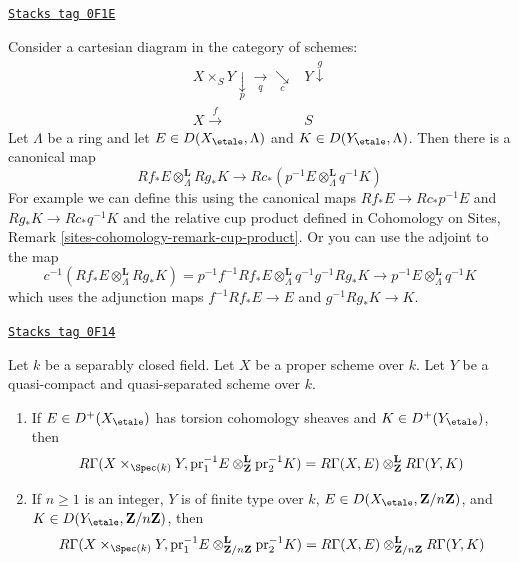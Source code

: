 \begin{remark}
\label{etale-cohomology-remark-define-kunneth-map}
\href{https://stacks.math.columbia.edu/tag/0F1E}{\texttt{Stacks tag 0F1E}}

Consider a cartesian diagram in the category of schemes:
$$
\begin{array}{cc}X \times_S Y \underset{p}{\downarrow}\underset{q}{\longrightarrow}\underset{c}{\searrow} & Y \overset{g}{\downarrow} \\ X \overset{f}{\longrightarrow} & S\end{array}
$$
Let $\Lambda$ be a ring and let $E \in D(X_\etale, \Lambda)$
and $K \in D(Y_\etale, \Lambda)$. Then there is a canonical map
$$
Rf_*E \otimes_\Lambda^\mathbf{L} Rg_*K
\longrightarrow
Rc_*(p^{-1}E \otimes_\Lambda^\mathbf{L} q^{-1}K)
$$
For example we can define this using the canonical maps
$Rf_*E \to Rc_*p^{-1}E$ and $Rg_*K \to Rc_*q^{-1}K$ and
the relative cup product defined in Cohomology on Sites,
Remark \ref{sites-cohomology-remark-cup-product}.
Or you can use the adjoint to the map
$$
c^{-1}(Rf_*E \otimes_\Lambda^\mathbf{L} Rg_*K)
=
p^{-1}f^{-1}Rf_*E \otimes_\Lambda^\mathbf{L} q^{-1} g^{-1}Rg_*K
\to
p^{-1}E \otimes_\Lambda^\mathbf{L} q^{-1}K
$$
which uses the adjunction maps $f^{-1}Rf_*E \to E$ and
$g^{-1}Rg_*K \to K$.
\end{remark}


\begin{lemma}
\label{etale-cohomology-lemma-kunneth-one-proper}
\href{https://stacks.math.columbia.edu/tag/0F14}{\texttt{Stacks tag 0F14}}

Let $k$ be a separably closed field. Let $X$ be a proper scheme over $k$.
Let $Y$ be a quasi-compact and quasi-separated scheme over $k$.
\begin{enumerate}
\item If $E \in D^+(X_\etale)$ has torsion cohomology sheaves and
$K \in D^+(Y_\etale)$, then
$$
R\Gamma(X \times_{\Spec(k)} Y,
\text{pr}_1^{-1}E
\otimes_\mathbf{Z}^\mathbf{L}
\text{pr}_2^{-1}K
)
=
R\Gamma(X, E)
\otimes_\mathbf{Z}^\mathbf{L}
R\Gamma(Y, K)
$$
\item If $n \geq 1$ is an integer, $Y$ is of finite type over $k$,
$E \in D(X_\etale, \mathbf{Z}/n\mathbf{Z})$, and
$K \in D(Y_\etale, \mathbf{Z}/n\mathbf{Z})$, then
$$
R\Gamma(X \times_{\Spec(k)} Y,
\text{pr}_1^{-1}E
\otimes_{\mathbf{Z}/n\mathbf{Z}}^\mathbf{L}
\text{pr}_2^{-1}K
)
=
R\Gamma(X, E)
\otimes_{\mathbf{Z}/n\mathbf{Z}}^\mathbf{L}
R\Gamma(Y, K)
$$
\end{enumerate}
\end{lemma}

